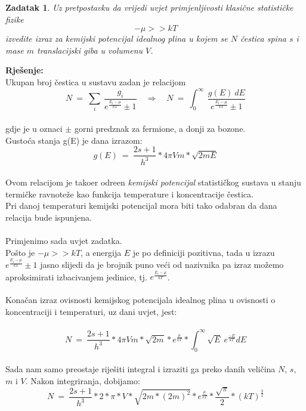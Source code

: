 \documentclass[a4paper,12pt]{article}
\newtheorem{ZDK}{Zadatak}[section]
\begin{document}
\newpage
\begin{ZDK}
	Uz pretpostavku da vrijedi uvjet primjenljivosti klasi\v{c}ne statisti\v{c}ke fizike 
			$$ - \mu >> kT  $$
	izvedite izraz za kemijski potencijal idealnog plina u kojem se $N$ \v{c}estica spina $s$ i mase $m$ translacijski giba u volumenu $V$.		
\end{ZDK}
\textbf{Rje\v{s}enje:} \\
\newline
Ukupan broj \v{c}estica u sustavu zadan je relacijom
\\
$$ N\ =\ \sum_{i}\ \frac{g_i}{e^{\frac{E_i-\mu}{kT}}\pm1} \quad \Rightarrow \quad  N\ =\ \int_{0}^{\infty}\ \frac{g(E)\ dE}{e^{\frac{E_i-\mu}{kT}}\pm1} $$
\\
gdje je u oznaci $\pm$ gorni predznak za fermione, a donji za bozone. \\
Gusto\'ca stanja g(E) je dana izrazom:
$$ g(E)\ =\ \frac{2s+1}{h^3}*4 \pi Vm*\sqrt{2mE} $$
\\
Ovom relacijom je tako\dj er odre\dj en \textit{kemijski potencijal} statisti\v{c}kog sustava u stanju termi\v{c}ke ravnote\v{z}e kao funkcija temperature i koncentracije \v{c}estica.
\\
Pri danoj temperaturi kemijski potencijal mora biti tako odabran da dana relacija bude ispunjena.
\\
\\
Primjenimo sada uvjet zadatka. \\
Po\v{s}to je $-\mu >> kT$, a energija $E$ je po definiciji pozitivna, tada u izrazu $e^{\frac{E_i-\mu}{kT}}\pm1$ jasno slijedi da je brojnik puno ve\'ci od nazivnika pa 
izraz mo\v{z}emo aproksimirati izbacivanjem jedinice, tj. $e^{\frac{E_i-\mu}{kT}}$.
\\
\\
Kona\v{c}an izraz ovisnosti kemijskog potencijala idealnog plina u ovisnosti o koncentraciji i temperaturi, uz dani uvjet, jest:
\\
\\
$$ N\ =\ \frac{2s+1}{h^3}*4 \pi Vm*\sqrt{2m}*e^{\frac{\mu}{kT}}*\int_{0}^{\infty} \sqrt{E}\ e^{\frac{-E}{kT}} dE $$
\\
Sada nam samo preostaje rije\v{s}iti integral i izraziti ga preko danih veli\v{c}ina $N$, $s$, $m$ i $V$.
\newpage
Nakon integriranja, dobijamo:
$$ N\ =\ \frac{2s+1}{h^3}*2*\pi*V*\sqrt{2m*(2m)^2}*e^{\frac{\mu}{kT}}*\frac{\sqrt{\pi}}{2}*(kT)^{\frac{3}{2}} $$
\end{document}
